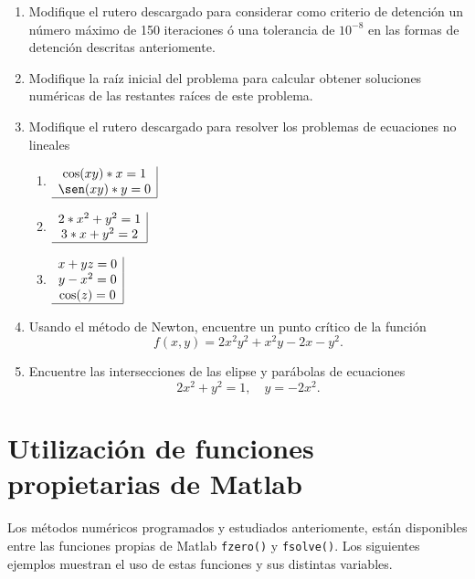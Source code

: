 \documentclass[letter,11pt]{article}
\newcommand\0{\mathbf{0}}
\newcommand{\matlab}{{\sc Matlab} }
\begin{document}
    \begin{enumerate}
    \item Modifique el rutero descargado para considerar como criterio de detenci\'on un n\'umero m\'aximo de 150 iteraciones \'o una tolerancia de $10^{-8}$ en las formas de detenci\'on descritas anteriomente.
    \item Modifique la ra\'iz inicial del problema para calcular obtener soluciones num\'ericas de las restantes ra\'ices de este problema.
    \item Modifique el rutero descargado para resolver los problemas de ecuaciones no lineales
    \begin{multicols}{3}
    \begin{enumerate}
    \item $\begin{array}{c|}
		   \cos(xy)*x=1\\
           \sen(xy)*y=0\\
           \hline
           \end{array}$
           
      \item $\begin{array}{c|}
		   2*x^2+y^2=1\\
           3*x+y^2=2\\
           \hline
           \end{array}$
           
       \item $\begin{array}{c|}
		   x+yz=0\\
           y-x^2=0\\
           \cos(z)=0\\
           \hline
           \end{array}$
    \end{enumerate}
    \end{multicols}
    
    \item Usando el m\'etodo de Newton, encuentre un punto cr\'itico de la funci\'on
    $$
    f(x,y)=2x^2y^2+x^2y-2x-y^2.
    $$
    
    \item Encuentre las intersecciones de las elipse y par\'abolas de ecuaciones
    $$
    2x^2+y^2=1 , \quad y=-2x^2.
    $$
    \end{enumerate}
    

\newpage
\section{Utilizaci\'on de funciones propietarias de \matlab}
Los m\'etodos num\'ericos programados y estudiados anteriomente, est\'an disponibles entre las funciones propias de \matlab \texttt{fzero()} y \texttt{fsolve()}. Los siguientes ejemplos muestran el uso de estas funciones y sus distintas variables.
\end{document}
